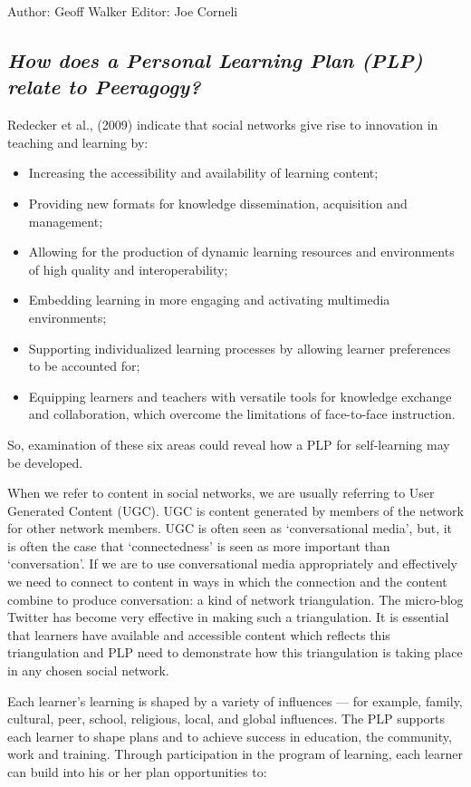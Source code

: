 Author: Geoff Walker Editor: Joe Corneli

\subsection{\emph{How does a Personal Learning Plan (PLP) relate to
Peeragogy?}}

Redecker et al., (2009) indicate that social networks give rise to
innovation in teaching and learning by:

\begin{itemize}
\item
  Increasing the accessibility and availability of learning content;
\item
  Providing new formats for knowledge dissemination, acquisition and
  management;
\item
  Allowing for the production of dynamic learning resources and
  environments of high quality and interoperability;
\item
  Embedding learning in more engaging and activating multimedia
  environments;
\item
  Supporting individualized learning processes by allowing learner
  preferences to be accounted for;
\item
  Equipping learners and teachers with versatile tools for knowledge
  exchange and collaboration, which overcome the limitations of
  face-to-face instruction.
\end{itemize}
So, examination of these six areas could reveal how a PLP for
self-learning may be developed.

When we refer to content in social networks, we are usually referring to
User Generated Content (UGC). UGC is content generated by members of the
network for other network members. UGC is often seen as `conversational
media', but, it is often the case that `connectedness' is seen as more
important than `conversation'. If we are to use conversational media
appropriately and effectively we need to connect to content in ways in
which the connection and the content combine to produce conversation: a
kind of network triangulation. The micro-blog Twitter has become very
effective in making such a triangulation. It is essential that learners
have available and accessible content which reflects this triangulation
and PLP need to demonstrate how this triangulation is taking place in
any chosen social network.

Each learner's learning is shaped by a variety of influences --- for
example, family, cultural, peer, school, religious, local, and global
influences. The PLP supports each learner to shape plans and to achieve
success in education, the community, work and training. Through
participation in the program of learning, each learner can build into
his or her plan opportunities to:

